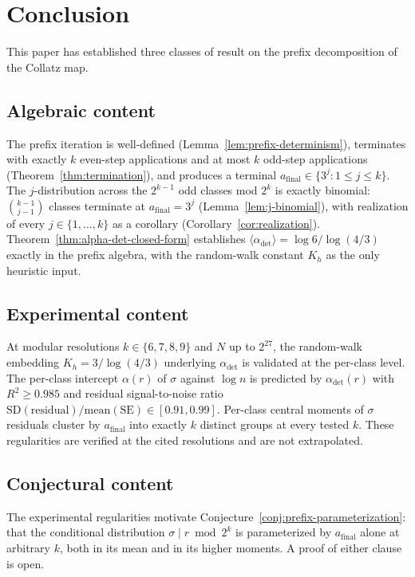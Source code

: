 \documentclass[pdflatex,sn-mathphys-num]{sn-jnl}
\theoremstyle{thmstyleone}%
\theoremstyle{definition}
\theoremstyle{plain}
\begin{document}
\section{Conclusion}
\label{sec:conclusion}
This paper has established three classes of result on the prefix decomposition of the Collatz map.
 
\subsection{Algebraic content} The prefix iteration is well-defined (Lemma~\ref{lem:prefix-determinism}), terminates with exactly $k$ even-step applications and at most $k$ odd-step applications (Theorem~\ref{thm:termination}), and produces a terminal $a_{\text{final}} \in \{3^j : 1 \leq j \leq k\}$. The $j$-distribution across the $2^{k-1}$ odd classes mod $2^k$ is exactly binomial: $\binom{k-1}{j-1}$ classes terminate at $a_{\text{final}} = 3^j$ (Lemma~\ref{lem:j-binomial}), with realization of every $j \in \{1, \ldots, k\}$ as a corollary (Corollary~\ref{cor:realization}). Theorem~\ref{thm:alpha-det-closed-form} establishes $\langle \alpha_{\text{det}} \rangle = \log 6 / \log(4/3)$ exactly in the prefix algebra, with the random-walk constant $K_h$ as the only heuristic input.
 
\subsection{Experimental content} At modular resolutions $k \in \{6, 7, 8, 9\}$ and $N$ up to $2^{27}$, the random-walk embedding $K_h = 3/\log(4/3)$ underlying $\alpha_{\text{det}}$ is validated at the per-class level. The per-class intercept $\alpha(r)$ of $\sigma$ against $\log n$ is predicted by $\alpha_{\text{det}}(r)$ with $R^2 \geq 0.985$ and residual signal-to-noise ratio $\mathrm{SD}(\text{residual})/\mathrm{mean}(\mathrm{SE}) \in [0.91, 0.99]$. Per-class central moments of $\sigma$ residuals cluster by $a_{\text{final}}$ into exactly $k$ distinct groups at every tested $k$. These regularities are verified at the cited resolutions and are not extrapolated.
 
\subsection{Conjectural content} The experimental regularities motivate Conjecture~\ref{conj:prefix-parameterization}: that the conditional distribution $\sigma \mid r \bmod 2^k$ is parameterized by $a_{\text{final}}$ alone at arbitrary $k$, both in its mean and in its higher moments. A proof of either clause is open.
 
\end{document}

